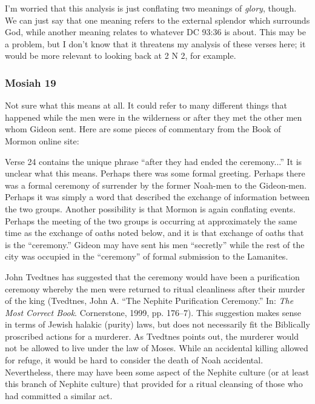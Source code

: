 \begin{compactdesc}
\begin{compactdesc}
		I'm worried that this analysis is just conflating two meanings of \textit{glory}, though. We can just say that one meaning refers to the external splendor which surrounds God, while another meaning relates to whatever DC 93:36 is about. This may be a problem, but I don't know that it threatens my analysis of these verses here; it would be more relevant to looking back at 2 N 2, for example. 
		\end{compactdesc}

		\end{compactdesc}

	\subsubsection{Mosiah 19} %

		\begin{compactdesc}

		\item[24$\vert$]
		\begin{compactdesc}
		\item[ended the ceremony] Not sure what this means at all. It could refer to many different things that happened while the men were in the wilderness or after they met the other men whom Gideon sent. Here are some pieces of commentary from the Book of Mormon online site:
		\begin{compactitem}
		\item Verse 24 contains the unique phrase ``after they had ended the ceremony...'' It is unclear what this means. Perhaps there was some formal greeting. Perhaps there was a formal ceremony of surrender by the former Noah-men to the Gideon-men. Perhaps it was simply a word that described the exchange of information between the two groups. Another possibility is that Mormon is again conflating events. Perhaps the meeting of the two groups is occurring at approximately the same time as the exchange of oaths noted below, and it is that exchange of oaths that is the ``ceremony.'' Gideon may have sent his men ``secretly'' while the rest of the city was occupied in the ``ceremony'' of formal submission to the Lamanites.

		John Tvedtnes has suggested that the ceremony would have been a purification ceremony whereby the men were returned to ritual cleanliness after their murder of the king (Tvedtnes, John A. ``The Nephite Purification Ceremony.'' In: \textit{The Most Correct Book}. Cornerstone, 1999, pp. 176--7). This suggestion makes sense in terms of Jewish halakic (purity) laws, but does not necessarily fit the Biblically proscribed actions for a murderer. As Tvedtnes points out, the murderer would not be allowed to live under the law of Moses. While an accidental killing allowed for refuge, it would be hard to consider the death of Noah accidental. Nevertheless, there may have been some aspect of the Nephite culture (or at least this branch of Nephite culture) that provided for a ritual cleansing of those who had committed a similar act.


\end{compactitem}
\end{compactdesc}
\end{compactdesc}
